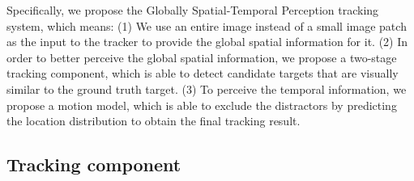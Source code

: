 Specifically, we propose the Globally Spatial-Temporal Perception tracking system, which means: (1) We use an entire image instead of a small image patch as the input to the tracker to provide the global spatial information for it.  (2) In order to better perceive the global spatial information, we propose a two-stage tracking component, which is able to detect candidate targets that are visually similar to the ground truth target. (3) To perceive the temporal information, we propose a motion model, which is able to exclude the distractors by predicting the location distribution to obtain the final tracking result.

\subsection{Tracking component}


